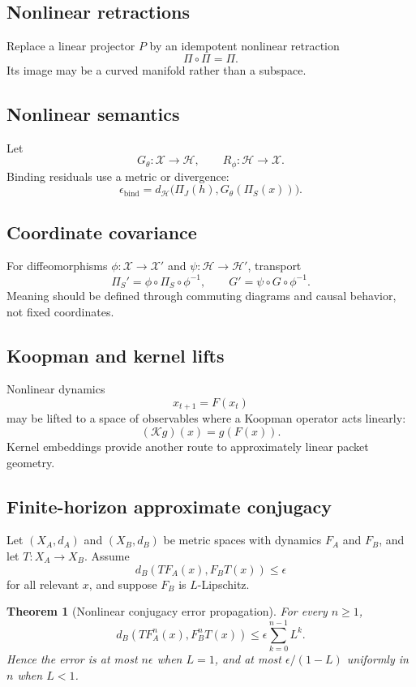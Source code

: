 \documentclass[11pt]{article}
\newtheorem{theorem}{Theorem}[section]
\theoremstyle{definition}
\theoremstyle{remark}
\newcommand{\Lat}{\mathcal H}
\newcommand{\CausalState}{\mathcal X}
\begin{document}
\subsection{Nonlinear retractions}

Replace a linear projector \(P\) by an idempotent nonlinear retraction
\[
\Pi\circ\Pi=\Pi.
\]
Its image may be a curved manifold rather than a subspace.

\subsection{Nonlinear semantics}

Let
\[
G_\theta:\CausalState\to\Lat,
\qquad
R_\phi:\Lat\to\CausalState.
\]
Binding residuals use a metric or divergence:
\[
\epsilon_{\mathrm{bind}}
=
d_{\Lat}
\bigl(
\Pi_J(h),
G_\theta(\Pi_S(x))
\bigr).
\]

\subsection{Coordinate covariance}

For diffeomorphisms \(\phi:\CausalState\to\CausalState'\) and \(\psi:\Lat\to\Lat'\), transport
\[
\Pi_S'=\phi\circ\Pi_S\circ\phi^{-1},
\qquad
G'=\psi\circ G\circ\phi^{-1}.
\]
Meaning should be defined through commuting diagrams and causal behavior, not fixed coordinates.

\subsection{Koopman and kernel lifts}

Nonlinear dynamics
\[
x_{t+1}=F(x_t)
\]
may be lifted to a space of observables where a Koopman operator acts linearly:
\[
(\mathcal K g)(x)=g(F(x)).
\]
Kernel embeddings provide another route to approximately linear packet geometry.

\subsection{Finite-horizon approximate conjugacy}

Let \((X_A,d_A)\) and \((X_B,d_B)\) be metric spaces with dynamics \(F_A\) and \(F_B\), and let \(T:X_A\to X_B\). Assume
\[
d_B(TF_A(x),F_BT(x))\le\epsilon
\]
for all relevant \(x\), and suppose \(F_B\) is \(L\)-Lipschitz.

\begin{theorem}[Nonlinear conjugacy error propagation]
For every \(n\ge1\),
\[
d_B\left(TF_A^n(x),F_B^nT(x)\right)
\le
\epsilon\sum_{k=0}^{n-1}L^k.
\]
Hence the error is at most \(n\epsilon\) when \(L=1\), and at most \(\epsilon/(1-L)\) uniformly in \(n\) when \(L<1\).
\end{theorem}
\end{document}
